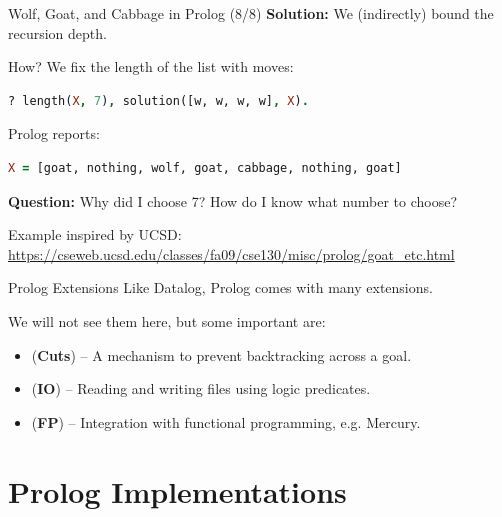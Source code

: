 \begin{frame}[fragile]{Wolf, Goat, and Cabbage in Prolog (8/8)}
\textbf{Solution:} We (indirectly) bound the recursion depth.

\pause

How? We fix the length of the list with moves:

\begin{lstlisting}[language=prolog, xleftmargin=0.5cm]
? length(X, 7), solution([w, w, w, w], X).
\end{lstlisting}

Prolog reports:

\begin{lstlisting}[language=prolog, xleftmargin=0.5cm]
X = [goat, nothing, wolf, goat, cabbage, nothing, goat]
\end{lstlisting}

\pause

\textbf{Question:} Why did I choose 7? How do I know what number to choose?

\pause

\bigskip 
\scriptsize
Example inspired by UCSD: {\tiny \url{https://cseweb.ucsd.edu/classes/fa09/cse130/misc/prolog/goat_etc.html}}
\end{frame}

\begin{frame}{Prolog Extensions}
Like Datalog, Prolog comes with many extensions. 

We will not see them here, but some important are:

\begin{itemize}
    \item (\textbf{Cuts})   -- A mechanism to prevent backtracking across a goal. 
    \item (\textbf{IO})     -- Reading and writing files using logic predicates. 
    \item (\textbf{FP})     -- Integration with functional programming, e.g. Mercury.
\end{itemize}
\end{frame}

\section{Prolog Implementations}

